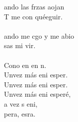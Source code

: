 \begin{cancion}%
	ando las frzas aojan\\
	T me con quéeguir. \\
\jump\\
	ando me cgo y me abio \\
	 sas mi vir. \\
\jump\\
	Cono en en n. \\
	Unvez más eni esper.\\
	Unvez más eni esper.\\
	Unvez más eni esperé,\\
	a vez s eni, \\
	 pera,  esra.  \\
\end{cancion}%
